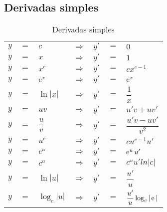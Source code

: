 \subsection{Derivadas simples}
	\begin{table}[H]
		\centering
		\begin{tabular}{|lclclcl|}
			$y$ & $=$ & $c$            & $\Rightarrow$ & $y'$ & $=$ & $0$                       \\
			$y$ & $=$ & $x$            & $\Rightarrow$ & $y'$ & $=$ & $1$                       \\
			$y$ & $=$ & $x^c$          & $\Rightarrow$ & $y'$ & $=$ & $cx^{c - 1}$              \\
			$y$ & $=$ & $\operatorname{e}^x$         & $\Rightarrow$ & $y'$ & $=$ & $\operatorname{e}^x$                    \\
			$y$ & $=$ & $\ln |x|$      & $\Rightarrow$ & $y'$ & $=$ & $\dfrac{1}{x}$            \\
			$y$ & $=$ & $uv$           & $\Rightarrow$ & $y'$ & $=$ & $u'v + uv'$               \\
			$y$ & $=$ & $\dfrac{u}{v}$ & $\Rightarrow$ & $y'$ & $=$ & $\dfrac{u'v - uv'}{v^2}$  \\
			$y$ & $=$ & $u^c$          & $\Rightarrow$ & $y'$ & $=$ & $cu^{c - 1}u'$            \\
			$y$ & $=$ & $\operatorname{e}^u$         & $\Rightarrow$ & $y'$ & $=$ & $\operatorname{e}^uu'$                  \\
			$y$ & $=$ & $c^u$          & $\Rightarrow$ & $y'$ & $=$ & $c^uu'ln|c|$              \\
			$y$ & $=$ & $\ln |u|$      & $\Rightarrow$ & $y'$ & $=$ & $\dfrac{u'}{u}$           \\
			$y$ & $=$ & $\log_c|u|$    & $\Rightarrow$ & $y'$ & $=$ & $\dfrac{u'}{u}\log_c|\operatorname{e}|$
		\end{tabular}
		\caption{Derivadas simples}
		\label{derivadas_simples}
	\end{table}

